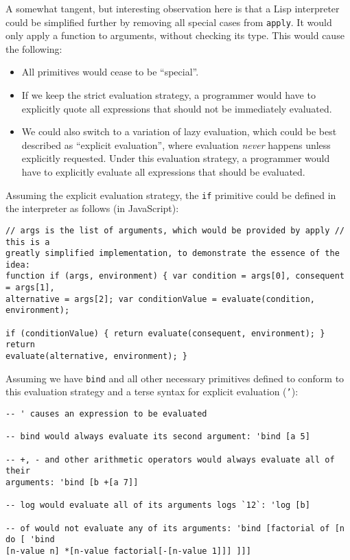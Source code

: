 A somewhat tangent, but interesting observation here is that a Lisp interpreter
could be simplified further by removing all special cases from
\texttt{apply}. It would only apply a function to arguments, without checking
its type. This would cause the following:
\begin{itemize}
    \item All primitives would cease to be ``special''.
    \item If we keep the strict evaluation strategy, a programmer would have
    to explicitly quote all expressions that should not be immediately
    evaluated.
    \item We could also switch to a variation of lazy evaluation, which
    could be best described as ``explicit evaluation'', where evaluation
    \textit{never} happens unless explicitly requested. Under this
    evaluation strategy, a programmer would have to explicitly evaluate
    all expressions that should be evaluated.
\end{itemize}

Assuming the explicit evaluation strategy, the \texttt{if} primitive could be
defined in the interpreter as follows (in JavaScript):
\begin{lstlisting}
// args is the list of arguments, which would be provided by apply // this is a
greatly simplified implementation, to demonstrate the essence of the idea:
function if (args, environment) { var condition = args[0], consequent = args[1],
alternative = args[2]; var conditionValue = evaluate(condition, environment);

if (conditionValue) { return evaluate(consequent, environment); } return
evaluate(alternative, environment); }
\end{lstlisting}

Assuming we have \texttt{bind} and all other necessary primitives defined to
conform to this evaluation strategy and a terse syntax for explicit evaluation
(\texttt{'}):
\begin{lstlisting}
-- ' causes an expression to be evaluated

-- bind would always evaluate its second argument: 'bind [a 5]

-- +, - and other arithmetic operators would always evaluate all of their
arguments: 'bind [b +[a 7]]

-- log would evaluate all of its arguments logs `12`: 'log [b]

-- of would not evaluate any of its arguments: 'bind [factorial of [n do [ 'bind
[n-value n] *[n-value factorial[-[n-value 1]]] ]]]
\end{lstlisting}

